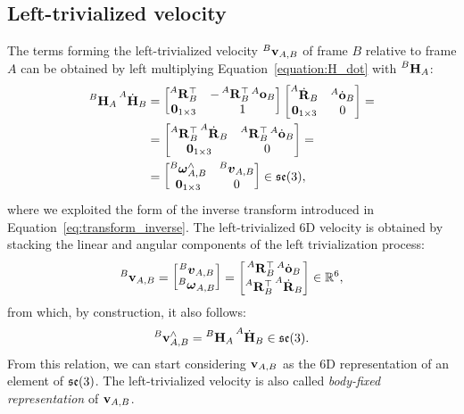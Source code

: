 \subsection{Left-trivialized velocity}

The terms forming the left-trivialized velocity $\velsix[B]_{A,B}$ of frame $B$ relative to frame $A$ can be obtained by left multiplying Equation~\eqref{equation:H_dot} with $\homo[B]_A$:
%
\begin{align*}
    \homo[B]_A \homod[A]_B
    &= \begin{bmatrix}
        \rot[A]_B^\top & -\rot[A]_B^\top \ori[A]_B \\
        \zeros_{1\times3} & 1
    \end{bmatrix}
    \begin{bmatrix}
        \rotd[A]_B & \orid[A]_B \\ \zeros_{1\times 3} & 0
    \end{bmatrix} =\\
    &= \begin{bmatrix}
        \rot[A]_B^\top \rotd[A]_B & \rot[A]_B^\top \orid[A]_B \\
        \zeros_{1\times 3} & 0
    \end{bmatrix} =\\
    &=
    \begin{bmatrix}
        \velang[B]_{A,B}^\wedge& \vellin[B]_{A,B} \\
        \zeros_{1\times 3} & 0
    \end{bmatrix}
    \in \se(3)
    ,
\end{align*}
%
where we exploited the form of the inverse transform introduced in Equation~\eqref{eq:transform_inverse}.
%
The left-trivialized 6D velocity is obtained by stacking the linear and angular components of the left trivialization process:
%
\begin{equation*}
    \velsix[B]_{A,B} =
    \begin{bmatrix}
        \vellin[B]_{A,B} \\ \velang[B]_{A,B}
    \end{bmatrix} =
    \begin{bmatrix}
        \rot[A]_B^\top \orid[A]_B \\
        \rot[A]_B^\top \rotd[A]_B
    \end{bmatrix}
    \in \realn^6
    ,
\end{equation*}
%
from which, by construction, it also follows:
%
\begin{equation}
    \label{eq:sixd_velocity_body_fixed}
    \velsix[B]_{A,B}^\wedge = \homo[B]_A \homod[A]_B \in \se(3)
    .
\end{equation}
%
From this relation, we can start considering $\velsix_{A,B}$ as the 6D representation of an element of $\se(3)$.
The left-trivialized velocity is also called \emph{body-fixed representation} of $\velsix_{A,B}$.

